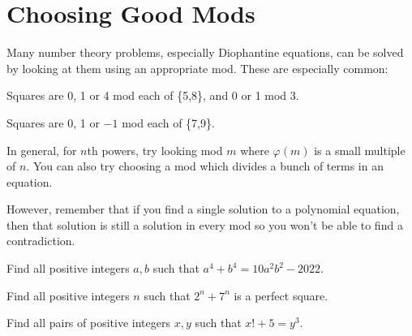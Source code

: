 \section{Choosing Good Mods}
Many number theory problems, especially Diophantine equations, can be solved by
looking at them using an appropriate mod. These are especially common:
\begin{result}\label{r:n:n:c:1}
    Squares are 0, 1 or 4 mod each of \{5,8\}, and 0 or 1 mod 3.
\end{result}
\begin{result}\label{r:n:n:c:2}
    Squares are 0, 1 or $-1$ mod each of \{7,9\}.
\end{result}
In general, for $n$th powers, try looking mod $m$ where $\varphi(m)$ is a
small multiple of $n$.
You can also try choosing a mod which divides a bunch of terms in an
equation.

However, remember that if you find a single solution to a polynomial equation, then that
solution is still a solution in every mod so you won't be able to find a
contradiction.
\begin{problem}{\label{p:n:n:c:1}}
  Find all positive integers $a,b$ such that $a^4+b^4=10a^2b^2-2022$.
\end{problem}
\begin{problem}{\label{p:n:n:c:2}}
  Find all positive integers $n$ such that $2^n+7^n$ is a perfect square.
\end{problem}
\begin{problem}{\label{p:n:n:c:3}}
  Find all pairs of positive integers $x,y$ such that $x!+5=y^3$.
\end{problem}
